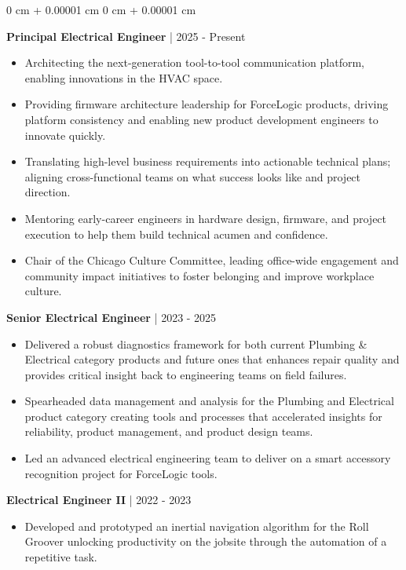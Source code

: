 \documentclass[10pt, letterpaper]{article}
\newenvironment{highlights}{
    \begin{itemize}[
        topsep=0.10 cm,
        parsep=0.10 cm,
        partopsep=0pt,
        itemsep=0pt,
        leftmargin=0 cm + 10pt
    ]
}{
    \end{itemize}
} %
\newenvironment{onecolentry}{
    \begin{adjustwidth}{
        0 cm + 0.00001 cm
    }{
        0 cm + 0.00001 cm
    }
}{
    \end{adjustwidth}
} %
\begin{document}
        \vspace{0.10 cm}
        \begin{onecolentry}
        \textbf{Principal Electrical Engineer} | 2025 - Present
            \begin{highlights}
                \item Architecting the next-generation tool-to-tool communication platform, enabling innovations in the HVAC space.
                \item Providing firmware architecture leadership for ForceLogic products, driving platform consistency and enabling new product development engineers to innovate quickly.
                \item Translating high-level business requirements into actionable technical plans; aligning cross-functional teams on what success looks like and project direction.
                \item Mentoring early-career engineers in hardware design, firmware, and project execution to help them build technical acumen and confidence.
                \item Chair of the Chicago Culture Committee, leading office-wide engagement and community impact initiatives to foster belonging and improve workplace culture.
            \end{highlights}
        \textbf{Senior Electrical Engineer} | 2023 - 2025
            \begin{highlights}
                \item Delivered a robust diagnostics framework for both current Plumbing \& Electrical category products and future ones that enhances repair quality and provides critical insight back to engineering teams on field failures.
                \item Spearheaded data management and analysis for the Plumbing and Electrical product category creating tools and processes that accelerated insights for reliability, product management, and product design teams.
                \item Led an advanced electrical engineering team to deliver on a smart accessory recognition project for ForceLogic tools.
            \end{highlights}
        \textbf{Electrical Engineer II} | 2022 - 2023
            \begin{highlights}
                \item Developed and prototyped an inertial navigation algorithm for the Roll Groover unlocking productivity on the jobsite through the automation of a repetitive task.

\end{highlights}
\end{onecolentry}
\end{document}
